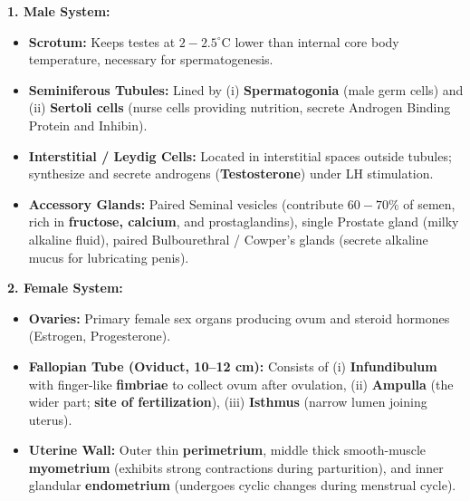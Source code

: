 \documentclass[10pt,a4paper]{article}
\begin{document}
\begin{conceptbox}
\textbf{1. Male System:}
\begin{itemize}
  \item \textbf{Scrotum:} Keeps testes at $2-2.5^\circ\mathrm{C}$ lower than internal core body temperature, necessary for spermatogenesis.
  \item \textbf{Seminiferous Tubules:} Lined by (i) \textbf{Spermatogonia} (male germ cells) and (ii) \textbf{Sertoli cells} (nurse cells providing nutrition, secrete Androgen Binding Protein and Inhibin).
  \item \textbf{Interstitial / Leydig Cells:} Located in interstitial spaces outside tubules; synthesize and secrete androgens (\textbf{Testosterone}) under LH stimulation.
  \item \textbf{Accessory Glands:} Paired Seminal vesicles (contribute $60-70\%$ of semen, rich in \textbf{fructose, calcium}, and prostaglandins), single Prostate gland (milky alkaline fluid), paired Bulbourethral / Cowper's glands (secrete alkaline mucus for lubricating penis).
\end{itemize}
\textbf{2. Female System:}
\begin{itemize}
  \item \textbf{Ovaries:} Primary female sex organs producing ovum and steroid hormones (Estrogen, Progesterone).
  \item \textbf{Fallopian Tube (Oviduct, 10--12 cm):} Consists of (i) \textbf{Infundibulum} with finger-like \textbf{fimbriae} to collect ovum after ovulation, (ii) \textbf{Ampulla} (the wider part; \textbf{site of fertilization}), (iii) \textbf{Isthmus} (narrow lumen joining uterus).
  \item \textbf{Uterine Wall:} Outer thin \textbf{perimetrium}, middle thick smooth-muscle \textbf{myometrium} (exhibits strong contractions during parturition), and inner glandular \textbf{endometrium} (undergoes cyclic changes during menstrual cycle).
\end{itemize}
\end{conceptbox}
\end{document}
